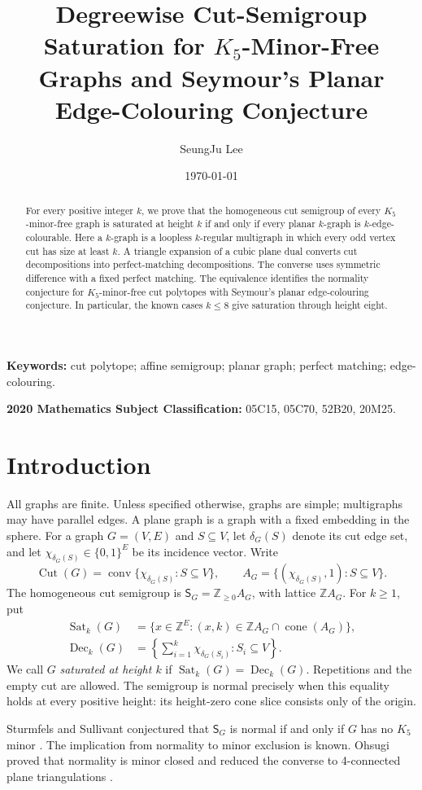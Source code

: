 \documentclass[10pt]{article}
\title{Degreewise Cut-Semigroup Saturation for $K_5$-Minor-Free Graphs and Seymour's Planar Edge-Colouring Conjecture}
\author{SeungJu Lee}
\date{\today}
\theoremstyle{definition}
\theoremstyle{remark}
\DeclareMathOperator{\Cut}{Cut}
\DeclareMathOperator{\Sat}{Sat}
\DeclareMathOperator{\Dec}{Dec}
\DeclareMathOperator{\conv}{conv}
\DeclareMathOperator{\cone}{cone}
\newcommand{\ZZ}{\mathbb Z}
\newcommand{\NN}{\mathbb Z_{\geq0}}
\begin{document}
\maketitle
\begin{abstract}
For every positive integer $k$, we prove that the homogeneous cut semigroup of every $K_5$-minor-free graph is saturated at height $k$ if and only if every planar $k$-graph is $k$-edge-colourable.
Here a $k$-graph is a loopless $k$-regular multigraph in which every odd vertex cut has size at least $k$.
A triangle expansion of a cubic plane dual converts cut decompositions into perfect-matching decompositions.
The converse uses symmetric difference with a fixed perfect matching.
The equivalence identifies the normality conjecture for $K_5$-minor-free cut polytopes with Seymour's planar edge-colouring conjecture.
In particular, the known cases $k\leq8$ give saturation through height eight.
\end{abstract}
\noindent\textbf{Keywords:} cut polytope; affine semigroup; planar graph; perfect matching; edge-colouring.\par
\smallskip
\noindent\textbf{2020 Mathematics Subject Classification:} 05C15, 05C70, 52B20, 20M25.

\section{Introduction}
All graphs are finite.
Unless specified otherwise, graphs are simple; multigraphs may have parallel edges.
A plane graph is a graph with a fixed embedding in the sphere.
For a graph $G=(V,E)$ and $S\subseteq V$, let $\delta_G(S)$ denote its cut edge set, and let $\chi_{\delta_G(S)}\in\{0,1\}^{E}$ be its incidence vector.
Write
\[
 \Cut(G)=\conv\{\chi_{\delta_G(S)}:S\subseteq V\},\qquad
 A_G=\{(\chi_{\delta_G(S)},1):S\subseteq V\}.
\]
The homogeneous cut semigroup is $\mathsf S_G=\NN A_G$, with lattice $\ZZ A_G$.
For $k\geq1$, put
\begin{align*}
 \Sat_k(G)&=\{x\in\ZZ^E:(x,k)\in\ZZ A_G\cap\cone(A_G)\},\\
 \Dec_k(G)&=\left\{\sum_{i=1}^k\chi_{\delta_G(S_i)}:S_i\subseteq V\right\}.
\end{align*}
We call $G$ \emph{saturated at height $k$} if $\Sat_k(G)=\Dec_k(G)$.
Repetitions and the empty cut are allowed.
The semigroup is normal precisely when this equality holds at every positive height: its height-zero cone slice consists only of the origin.

Sturmfels and Sullivant conjectured that $\mathsf S_G$ is normal if and only if $G$ has no $K_5$ minor \cite[Conjecture~3.7]{SS}.
The implication from normality to minor exclusion is known.
Ohsugi proved that normality is minor closed \cite[Corollary~2.4]{Ohsugi} and reduced the converse to 4-connected plane triangulations \cite[Section~4]{Ohsugi}.
\end{document}
